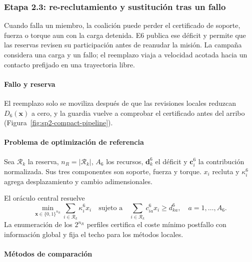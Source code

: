 \subsubsection{Etapa 2.3: re-reclutamiento y sustitución tras un fallo}
\label{subsubsec:sp2-recovery}

Cuando falla un miembro, la coalición puede perder el certificado de soporte, fuerza o torque aun con la carga detenida. E6 publica ese déficit y permite que las reservas revisen su participación antes de reanudar la misión. La campaña considera una carga y un fallo; el reemplazo viaja a velocidad acotada hacia un contacto prefijado en una trayectoria libre.

\paragraph{Fallo y reserva}

El reemplazo solo se moviliza después de que las revisiones locales reduzcan $D_6(\boldsymbol x)$ a cero, y la guardia vuelve a comprobar el certificado antes del arribo (Figura~\ref{fig:sp2-compact-pipeline}).


\paragraph{Problema de optimización de referencia}

Sea $\mathcal R_k$ la reserva, $n_R=|\mathcal R_k|$, $A_6$ los recursos, $\boldsymbol d_k^6$ el déficit y $\boldsymbol c_i^6$ la contribución normalizada. Sus tres componentes son soporte, fuerza y torque. $x_i$ recluta y $\kappa_i^6$ agrega desplazamiento y cambio adimensionales.

El oráculo central resuelve
\begin{equation}
\label{eq:sp6-oracle}
  \min_{\boldsymbol x\in\{0, 1\}^{n_R}}
  \sum_{i\in\mathcal R_k}\kappa_i^6x_i
  \quad\text{sujeto a}\quad
  \sum_{i\in\mathcal R_k}c_{ia}^6x_i\geq d_{ka}^6,
  \quad a=1,\ldots,A_6.
\end{equation}
La enumeración de los $2^{n_R}$ perfiles certifica el coste mínimo postfallo con información global y fija el techo para los métodos locales.

\paragraph{Métodos de comparación}

